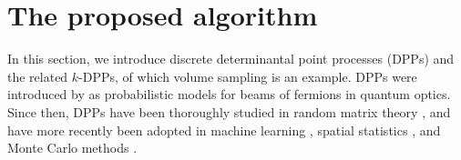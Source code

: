 \documentclass[twoside,11pt]{book}
\newcommand{\rev}[1]{\textcolor{darkgreen}{#1}}
\numberwithin{theorem}{chapter}
\numberwithin{definition}{chapter}
\numberwithin{proposition}{chapter}
\numberwithin{corollary}{chapter}
\numberwithin{example}{chapter}
\numberwithin{lemma}{chapter}
\begin{document}

\section{The proposed algorithm}






In this section, we introduce discrete determinantal point processes (DPPs) and the related $k$-DPPs, of which volume sampling is an example. DPPs were introduced by \cite{Mac75} as probabilistic models for beams of fermions in quantum optics. Since then, DPPs have been thoroughly studied in random matrix theory \citep{Joh05}, and have more recently been adopted in machine learning \citep*{KuTa12}, spatial statistics \citep*{LaMoRu15}, and Monte Carlo methods \citep{BaHa16}.
\end{document}
